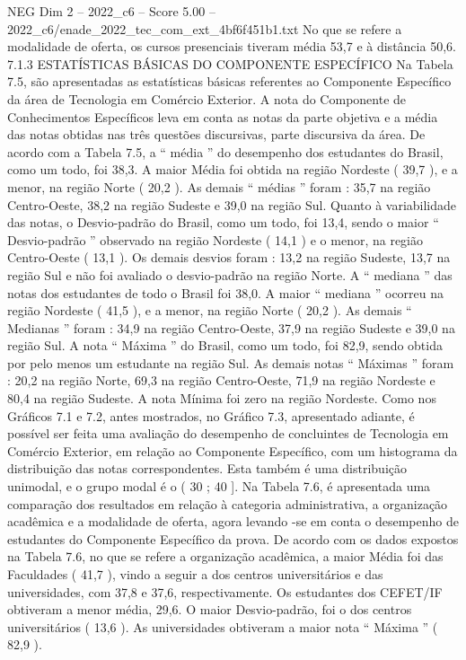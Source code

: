 \begin{textsample}{NEG Dim 2 – 2022\_c6 – Score 5.00 – 2022\_c6/enade\_2022\_tec\_com\_ext\_4bf6f451b1.txt}
No que se refere a modalidade de oferta, os cursos presenciais tiveram média 53,7 e à distância 50,6. 7.1.3 ESTATÍSTICAS BÁSICAS DO COMPONENTE ESPECÍFICO Na Tabela 7.5, são apresentadas as estatísticas básicas referentes ao Componente Específico da área de Tecnologia em Comércio Exterior.
A nota do Componente de Conhecimentos Específicos leva em conta as notas da parte objetiva e a média das notas obtidas nas três questões discursivas, parte discursiva da área.
De acordo com a Tabela 7.5, a “ média ” do desempenho dos estudantes do Brasil, como um todo, foi 38,3.
A maior Média foi obtida na região Nordeste ( 39,7 ), e a menor, na região Norte ( 20,2 ).
As demais “ médias ” foram : 35,7 na região Centro-Oeste, 38,2 na região Sudeste e 39,0 na região Sul.
Quanto à variabilidade das notas, o Desvio-padrão do Brasil, como um todo, foi 13,4, sendo o maior “ Desvio-padrão ” observado na região Nordeste ( 14,1 ) e o menor, na região Centro-Oeste ( 13,1 ).
Os demais desvios foram : 13,2 na região Sudeste, 13,7 na região Sul e não foi avaliado o desvio-padrão na região Norte.
A “ mediana ” das notas dos estudantes de todo o Brasil foi 38,0.
A maior “ mediana ” ocorreu na região Nordeste ( 41,5 ), e a menor, na região Norte ( 20,2 ).
As demais “ Medianas ” foram : 34,9 na região Centro-Oeste, 37,9 na região Sudeste e 39,0 na região Sul.
A nota “ Máxima ” do Brasil, como um todo, foi 82,9, sendo obtida por pelo menos um estudante na região Sul.
As demais notas “ Máximas ” foram : 20,2 na região Norte, 69,3 na região Centro-Oeste, 71,9 na região Nordeste e 80,4 na região Sudeste.
A nota Mínima foi zero na região Nordeste.
Como nos Gráficos 7.1 e 7.2, antes mostrados, no Gráfico 7.3, apresentado adiante, é possível ser feita uma avaliação do desempenho de concluintes de Tecnologia em Comércio Exterior, em relação ao Componente Específico, com um histograma da distribuição das notas correspondentes.
Esta também é uma distribuição unimodal, e o grupo modal é o ( 30 ; 40 ].
Na Tabela 7.6, é apresentada uma comparação dos resultados em relação à categoria administrativa, a organização acadêmica e a modalidade de oferta, agora levando -se em conta o desempenho de estudantes do Componente Específico da prova.
De acordo com os dados expostos na Tabela 7.6, no que se refere a organização acadêmica, a maior Média foi das Faculdades ( 41,7 ), vindo a seguir a dos centros universitários e das universidades, com 37,8 e 37,6, respectivamente.
Os estudantes dos CEFET/IF obtiveram a menor média, 29,6.
O maior Desvio-padrão, foi o dos centros universitários ( 13,6 ).
As universidades obtiveram a maior nota “ Máxima ” ( 82,9 ).

\end{textsample}

